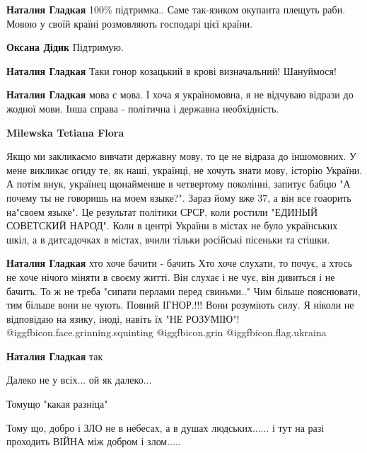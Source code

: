 \begin{itemize}
\begin{itemize}
\textbf{Наталия Гладкая} 100\% підтримка..
Саме так-язиком окупанта плещуть раби.
Мовою у своїй країні розмовляють господарі цієї країни.

\begin{itemize} %
\textbf{Оксана Дідик} Підтримую.
\end{itemize} %

\textbf{Наталия Гладкая}
Таки гонор козацький в крові визначальний!
Шануймося!

\textbf{Наталия Гладкая} мова є мова. І хоча я україномовна, я не відчуваю відрази до жодної мови. Інша справа - політична і державна необхідність.

\begin{itemize} %
\textbf{Milewska Tetiana Flora} 

Якщо ми закликаємо вивчати державну мову, то це не відраза до іншомовних. У
мене викликає огиду те, як наші, українці, не хочуть знати мову, історію
України. А потім внук, українец щонайменше в четвертому поколінні, запитує
бабцю "А почему ты не говоришь на моем языке?". Зараз йому вже 37, а він все
гоаорить на"своем языке". Це результат політики СРСР, коли ростили "ЕДИНЫЙ
СОВЕТСКИЙ НАРОД". Коли в центрі України в містах не було українських шкіл, а в
дитсадочках в містах, вчили тільки російські пісеньки та стішки.


\textbf{Наталия Гладкая} хто хоче бачити - бачить
Хто хоче слухати, то почує, а хтось не хоче нічого міняти в своєму житті. Він слухає і не чує, він дивиться і не бачить.
То ж не треба "сипати перлами перед свиньми.."
Чим більше пояснювати, тим більше вони не чують.
Повний ІГНОР.!!! Вони розуміють силу.
Я ніколи не відповідаю на язику, іноді, навіть їх "НЕ РОЗУМІЮ"!  @igg{fbicon.face.grinning.squinting}  @igg{fbicon.grin} @igg{fbicon.flag.ukraina}

\textbf{Наталия Гладкая} так
\end{itemize} %

\end{itemize} %

Далеко не у всіх... ой як далеко...

Томущо "какая разніца"

Тому що, добро і ЗЛО не в небесах, а в душах людських...... і тут на разі проходить ВІЙНА між добром і злом.....


\end{itemize}

